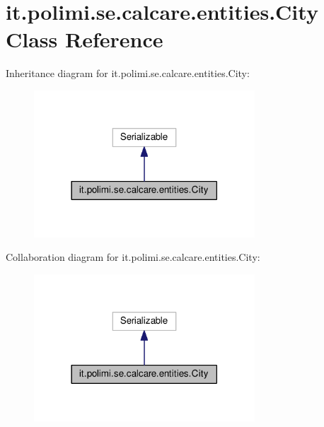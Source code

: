\hypertarget{classit_1_1polimi_1_1se_1_1calcare_1_1entities_1_1City}{}\section{it.\+polimi.\+se.\+calcare.\+entities.\+City Class Reference}
\label{classit_1_1polimi_1_1se_1_1calcare_1_1entities_1_1City}


Inheritance diagram for it.\+polimi.\+se.\+calcare.\+entities.\+City\+:
\nopagebreak
\begin{figure}[H]
\begin{center}
\leavevmode
\includegraphics[width=234pt]{classit_1_1polimi_1_1se_1_1calcare_1_1entities_1_1City__inherit__graph}
\end{center}
\end{figure}


Collaboration diagram for it.\+polimi.\+se.\+calcare.\+entities.\+City\+:
\nopagebreak
\begin{figure}[H]
\begin{center}
\leavevmode
\includegraphics[width=234pt]{classit_1_1polimi_1_1se_1_1calcare_1_1entities_1_1City__coll__graph}
\end{center}
\end{figure}
